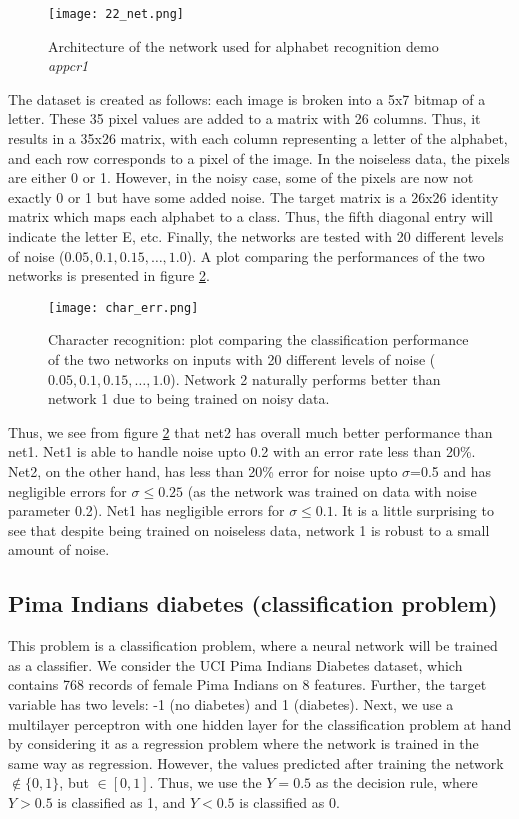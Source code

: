 \documentclass[paper=a4, fontsize=11pt]{scrartcl} %
\numberwithin{equation}{section} %
\begin{document}
\begin{figure}[ht]
\centering
\texttt{[image: 22\_net.png]}
\caption{Architecture of the network used for alphabet recognition demo \emph{appcr1}}
\label{charnet}
\end{figure}

The dataset is created as follows: each image is broken into a 5x7 bitmap of a letter. These 35 pixel values are added to a matrix with 26 columns. Thus, it results in a 35x26 matrix, with each column representing a letter of the alphabet, and each row corresponds to a pixel of the image. In the noiseless data, the pixels are either 0 or 1. However, in the noisy case, some of the pixels are now not exactly 0 or 1 but have some added noise. The target matrix is a 26x26 identity matrix which maps each alphabet to a class. Thus, the fifth diagonal entry will indicate the letter E, etc. Finally, the networks are tested with 20 different levels of noise ($0.05, 0.1, 0.15, \ldots, 1.0$). A plot comparing the performances of the two networks is presented in figure \ref{charerr}.\\

\begin{figure}[ht]
\centering
\texttt{[image: char\_err.png]}
\caption{Character recognition: plot comparing the classification performance of the two networks on inputs with 20 different levels of noise ($0.05, 0.1, 0.15, \ldots, 1.0$). Network 2 naturally performs better than network 1 due to being trained on noisy data.}
\label{charerr}
\end{figure}

Thus, we see from figure \ref{charerr} that net2 has overall much better performance than net1. Net1 is able to handle noise upto 0.2 with an error rate less than 20\%. Net2, on the other hand, has less than 20\% error for noise upto $\sigma$=0.5 and has negligible errors for $\sigma \leq 0.25$ (as the network was trained on data with noise parameter 0.2). Net1 has negligible errors for $\sigma \leq 0.1$. It is a little surprising to see that despite being trained on noiseless data, network 1 is robust to a small amount of noise. 

\subsection{Pima Indians diabetes (classification problem)}
This problem is a classification problem, where a neural network will be trained as a classifier. We consider the UCI Pima Indians Diabetes dataset, which contains 768 records of female Pima Indians on 8 features. Further, the target variable has two levels: -1 (no diabetes) and 1 (diabetes). Next, we use a multilayer perceptron with one hidden layer for the classification problem at hand by considering it as a regression problem where the network is trained in the same way as regression. However, the values predicted after training the network $\notin \{0,1\}$, but $\in [0,1]$. Thus, we use the $Y=0.5$ as the decision rule, where $Y>0.5$ is classified as 1, and $Y<0.5$ is classified as 0.\\
\end{document}
